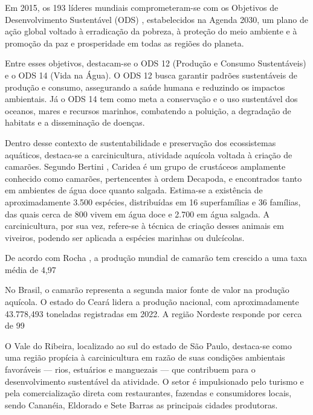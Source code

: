 Em 2015, os 193 líderes mundiais comprometeram-se com os Objetivos de Desenvolvimento Sustentável (ODS) \cite{ODS12}, estabelecidos na Agenda 2030, um plano de ação global voltado à erradicação da pobreza, à proteção do meio ambiente e à promoção da paz e prosperidade em todas as regiões do planeta.

Entre esses objetivos, destacam-se o ODS 12 (Produção e Consumo Sustentáveis) e o ODS 14 (Vida na Água). O ODS 12 busca garantir padrões sustentáveis de produção e consumo, assegurando a saúde humana e reduzindo os impactos ambientais. Já o ODS 14 tem como meta a conservação e o uso sustentável dos oceanos, mares e recursos marinhos, combatendo a poluição, a degradação de habitats e a disseminação de doenças.

Dentro desse contexto de sustentabilidade e preservação dos ecossistemas aquáticos, destaca-se a carcinicultura, atividade aquícola voltada à criação de camarões. Segundo Bertini \cite{bertini2021}, Caridea é um grupo de crustáceos amplamente conhecido como camarões, pertencentes à ordem Decapoda, e encontrados tanto em ambientes de água doce quanto salgada. Estima-se a existência de aproximadamente 3.500 espécies, distribuídas em 16 superfamílias e 36 famílias, das quais cerca de 800 vivem em água doce e 2.700 em água salgada. A carcinicultura, por sua vez, refere-se à técnica de criação desses animais em viveiros, podendo ser aplicada a espécies marinhas ou dulcícolas.

De acordo com Rocha \cite{Rocha2023}, a produção mundial de camarão tem crescido a uma taxa média de 4,97%

No Brasil, o camarão representa a segunda maior fonte de valor na produção aquícola. O estado do Ceará lidera a produção nacional, com aproximadamente 43.778,493 toneladas registradas em 2022. A região Nordeste responde por cerca de 99%

O Vale do Ribeira, localizado ao sul do estado de São Paulo, destaca-se como uma região propícia à carcinicultura em razão de suas condições ambientais favoráveis — rios, estuários e manguezais — que contribuem para o desenvolvimento sustentável da atividade. O setor é impulsionado pelo turismo e pela comercialização direta com restaurantes, fazendas e consumidores locais, sendo Cananéia, Eldorado e Sete Barras as principais cidades produtoras.

